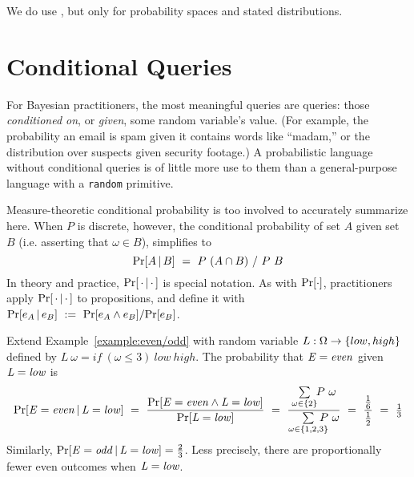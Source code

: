 We do use , but only for probability spaces and stated distributions.


\section{Conditional Queries}

For Bayesian practitioners, the most meaningful queries are  queries: those \textit{conditioned on}, or \textit{given}, some random variable's value. (For example, the probability an email is spam given it contains words like ``madam,'' or the distribution over suspects given security footage.) A probabilistic language without conditional queries is of little more use to them than a general-purpose language with a \texttt{random} primitive.

Measure-theoretic conditional probability is too involved to accurately summarize here. When $P$ is discrete, however, the conditional probability of set $A$ given set $B$ (i.e. asserting that $\omega \in B$), simplifies to
\begin{equation}
	\mathrm{Pr}\!\left[{A \,|\, B}\right]\ =\ P~(A \cap B)~{/}~P~B
\label{eqn:discrete-conditioning}
\end{equation}
In theory and practice, $\mathrm{Pr}\!\left[{\,\cdot \,|\, \cdot\,}\right]$ is special notation. As with $\mathrm{Pr}\!\left[{\cdot}\right]$, practitioners apply $\mathrm{Pr}\!\left[{\,\cdot \,|\, \cdot\,}\right]$ to propositions, and define it with $\mathrm{Pr}\!\left[{e_A \,|\, e_B}\right]\ :=\ {\mathrm{Pr}\!\left[{e_A \wedge e_B}\right]} / {\mathrm{Pr}\!\left[{e_B}\right]}$.

\begin{example}
\label{example:low/high}
Extend Example~\ref{example:even/odd} with random variable $L : \Omega \to \{{low,high}\}$ defined by $L~\omega = if~(\omega \le 3)~low~high$. The probability that $\mathit{E=even}$ given $\mathit{L=low}$ is
\begin{equation}
	\Pspec{\objlang{E=even \given L=low}}
		\ =\ \frac{\Pspec{\objlang{E=even \wedge L=low}}}{\Pspec{\objlang{L=low}}}
		\ =\ \frac{\sum\limits_{\omega \in \set{2}} \mspace{-5mu} \app P \omega}
					{\sum\limits_{\omega \in \set{1,2,3}} \mspace{-17mu} \app P \omega}
		\ =\ \frac{\tfrac{1}{6}}{\tfrac{1}{2}}
		\ =\ \tfrac{1}{3}
\end{equation}
Similarly, $\mathrm{Pr}\!\left[{\mathit{E=odd \,|\, L=low}}\right] = \frac{2}{3}$.
Less precisely, there are proportionally fewer even outcomes when $\mathit{L=low}$.
\exampleqed
\end{example}


